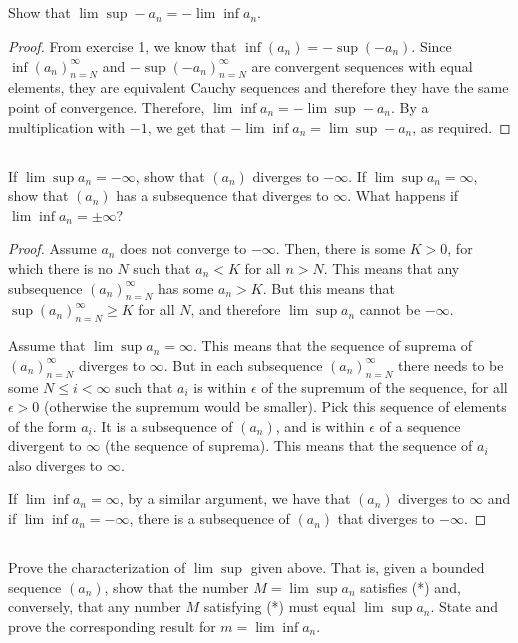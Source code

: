 \subsection{} Show that $\lim \sup -a_n= -\lim \inf a_n$.

\begin{proof}
From exercise 1, we know that $\inf(a_n) = -\sup(-a_n)$. Since $\inf(a_n)_{n=N}^{\infty}$ and $-\sup(-a_n)_{n=N}^{\infty}$ are convergent sequences with equal elements, they are equivalent Cauchy sequences and therefore they have the same point of convergence. Therefore, $\lim \inf a_n= -\lim \sup -a_n$. By a multiplication with $-1$, we get that $-\lim \inf a_n= \lim \sup -a_n$, as required.
\end{proof}


\subsection{} If $\lim \sup a_n = -\infty$, show that $(a_n)$ diverges to $-\infty$. If $\lim \sup a_n = \infty$, show that $(a_n)$ has  a subsequence that diverges to $\infty$. What happens if $\lim \inf a_n = ±\infty$?

\begin{proof}
Assume $a_n$ does not converge to $-\infty$. Then, there is some $K>0$, for which there is no $N$ such that $a_n < K$ for all $n > N$. This means that any subsequence $(a_n)_{n=N}^{\infty}$ has some $a_n > K$. But this means that $\sup (a_n)_{n=N}^{\infty} \geq K$ for all $N$, and therefore $\lim \sup a_n$ cannot be $-\infty$.

Assume that $\lim \sup a_n = \infty$. This means that the sequence of suprema of $(a_n)_{n=N}^{\infty}$ diverges to $\infty$. But in each subsequence $(a_n)_{n=N}^{\infty}$ there needs to be some $N \leq i < \infty$ such that $a_i$ is within $\epsilon$ of the supremum of the sequence, for all $\epsilon > 0$ (otherwise the supremum would be smaller). Pick this sequence of elements of the form $a_i$. It is a subsequence of $(a_n)$, and is within $\epsilon$ of a sequence divergent to $\infty$ (the sequence of suprema). This means that the sequence of $a_i$ also diverges to $\infty$.

If $\lim \inf a_n = \infty$, by a similar argument, we have that $(a_n)$ diverges to $\infty$ and if $\lim \inf a_n = -\infty$, there is a subsequence of $(a_n)$ that diverges to $-\infty$. 
\end{proof}

\subsection{} Prove the characterization of $\lim \sup$ given above. That is, given a bounded sequence $(a_n)$, show that the number $M = \lim \sup a_n$ satisfies (*) and, conversely, that any number $M$ satisfying (*) must equal $\lim \sup a_n$. State and prove the corresponding result for $m = \lim \inf a_n$.


